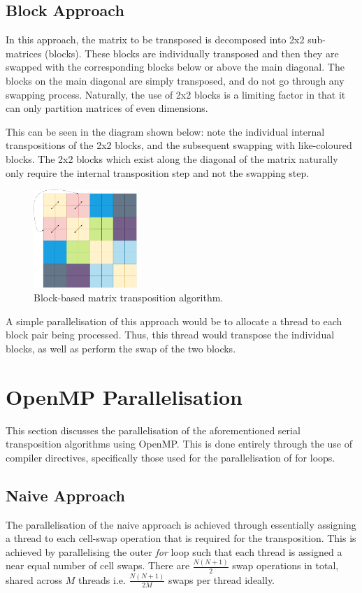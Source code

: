 \documentclass[journal,10pt]{IEEEtran}
\begin{document}
\subsection{Block Approach}
In this approach, the matrix to be transposed is decomposed into 2x2 sub-matrices (blocks). These blocks are individually transposed and then they are swapped with the corresponding blocks below or above the main diagonal. The blocks on the main diagonal are simply transposed, and do not go through any swapping process. Naturally, the use of 2x2 blocks is a limiting factor in that it can only partition matrices of even dimensions.



This can be seen in the diagram shown below: note the individual internal transpositions of the 2x2 blocks, and the subsequent swapping with like-coloured blocks. The 2x2 blocks which exist along the diagonal of the matrix naturally only require the internal transposition step and not the swapping step. 

\begin{figure}[H]
    \centering
    \includegraphics[width=0.35\textwidth]{block.pdf}
    \caption{Block-based matrix transposition algorithm.}
    \label{fig:my_label}
\end{figure}

A simple parallelisation of this approach would be to allocate a thread to each block pair being processed. Thus, this thread would transpose the individual blocks, as well as perform the swap of the two blocks.


\section{OpenMP Parallelisation}

This section discusses the parallelisation of the aforementioned serial transposition algorithms using OpenMP. This is done entirely through the use of compiler directives, specifically those used for the parallelisation of for loops.


\subsection{Naive Approach}
The parallelisation of the naive approach is achieved through essentially assigning a thread to each cell-swap operation that is required for the transposition. This is achieved by parallelising the outer \textit{for} loop such that each thread is assigned a near equal number of cell swaps. There are $\frac{N(N+1)}{2}$ swap operations in total, shared across $M$ threads i.e. $\frac{N(N+1)}{2M}$ swaps per thread ideally.
\end{document}

